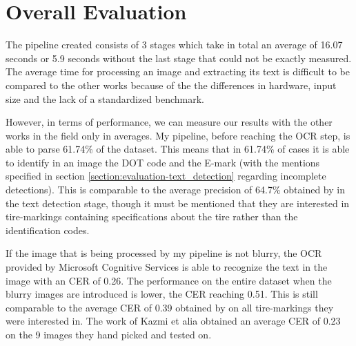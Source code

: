 \section{Overall Evaluation}\label{section:evaluation-overall}

The pipeline created consists of 3 stages which take in total an average of 16.07 seconds or 5.9 seconds without the last stage that could not be exactly measured. The average time for processing an image and extracting its text is difficult to be compared to the other works \cite{article:1} \cite{site:0} because of the the differences in hardware, input size and the lack of a standardized benchmark.

However, in terms of performance, we can measure our results with the other works in the field only in averages. My pipeline, before reaching the OCR step, is able to parse 61.74\% of the dataset. This means that in 61.74\% of cases it is able to identify in an image the DOT code and the E-mark (with the mentions specified in section \ref{section:evaluation-text_detection} regarding incomplete detections). This is comparable to the average precision of 64.7\% obtained by \cite{site:0} in the text detection stage, though it must be mentioned that they are interested in tire-markings containing specifications about the tire rather than the identification codes.

If the image that is being processed by my pipeline is not blurry, the OCR provided by Microsoft Cognitive Services \cite{site:Microsoft_Cognitive_Services-Read_API-OCR} is able to recognize the text in the image with an CER of 0.26. The performance on the entire dataset when the blurry images are introduced is lower, the CER reaching 0.51. This is still comparable to the average CER of 0.39 obtained by \cite{site:0} on all tire-markings they were interested in. The work of Kazmi et alia \cite{article:1} obtained an average CER of 0.23 on the 9 images they hand picked and tested on.
